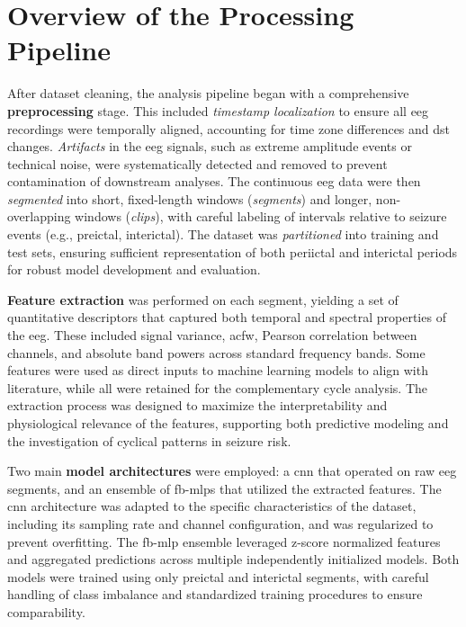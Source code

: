\section{Overview of the Processing Pipeline} \label{sec:pipeline-overview}

After dataset cleaning, the analysis pipeline began with a comprehensive \textbf{preprocessing} stage.
This included \textit{timestamp localization} to ensure all \gls{eeg} recordings were temporally aligned, accounting for time zone differences and \gls{dst} changes.
\textit{Artifacts} in the \gls{eeg} signals, such as extreme amplitude events or technical noise, were systematically detected and removed to prevent contamination of downstream analyses.
The continuous \gls{eeg} data were then \textit{segmented} into short, fixed-length windows (\textit{segments}) and longer, non-overlapping windows (\textit{clips}), with careful labeling of intervals relative to seizure events (e.g., preictal, interictal).
The dataset was \textit{partitioned} into training and test sets, ensuring sufficient representation of both periictal and interictal periods for robust model development and evaluation.

\textbf{Feature extraction} was performed on each segment, yielding a set of quantitative descriptors that captured both temporal and spectral properties of the \gls{eeg}.
These included signal variance, \gls{acfw}, Pearson correlation between channels, and absolute band powers across standard frequency bands.
Some features were used as direct inputs to machine learning models to align with literature, while all were retained for the complementary cycle analysis.
The extraction process was designed to maximize the interpretability and physiological relevance of the features, supporting both predictive modeling and the investigation of cyclical patterns in seizure risk.

Two main \textbf{model architectures} were employed: a \gls{cnn} that operated on raw \gls{eeg} segments, and an ensemble of \glspl{fb-mlp} that utilized the extracted features.
The \gls{cnn} architecture was adapted to the specific characteristics of the dataset, including its sampling rate and channel configuration, and was regularized to prevent overfitting.
The \gls{fb-mlp} ensemble leveraged z-score normalized features and aggregated predictions across multiple independently initialized models.
Both models were trained using only preictal and interictal segments, with careful handling of class imbalance and standardized training procedures to ensure comparability.

